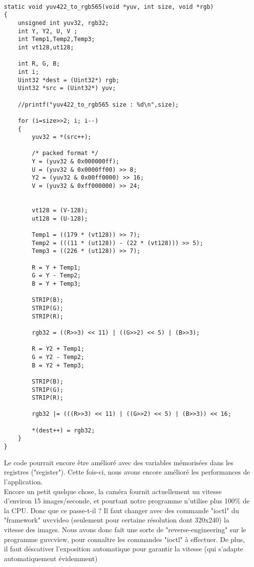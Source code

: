 \begin{lstlisting}[frame=single,style=C]  % Start your code-block

static void yuv422_to_rgb565(void *yuv, int size, void *rgb)
{
	unsigned int yuv32, rgb32;
	int Y, Y2, U, V ;
	int Temp1,Temp2,Temp3;
	int vt128,ut128;
	
	int R, G, B;
	int i;
	Uint32 *dest = (Uint32*) rgb;
	Uint32 *src = (Uint32*) yuv;

	//printf("yuv422_to_rgb565 size : %d\n",size);	

	for (i=size>>2; i; i--)
	{
		yuv32 = *(src++);

		/* packed format */
		Y = (yuv32 & 0x000000ff);
		U = (yuv32 & 0x0000ff00) >> 8;
		Y2 = (yuv32 & 0x00ff0000) >> 16;
		V = (yuv32 & 0xff000000) >> 24;


		vt128 = (V-128);
		ut128 = (U-128);	

		Temp1 = ((179 * (vt128)) >> 7);
		Temp2 = (((11 * (ut128)) - (22 * (vt128))) >> 5);
		Temp3 = ((226 * (ut128)) >> 7);

		R = Y + Temp1;
		G = Y - Temp2;
		B = Y + Temp3;

		STRIP(B);
		STRIP(G);
		STRIP(R);
	
		rgb32 = ((R>>3) << 11) | ((G>>2) << 5) | (B>>3);
		
		R = Y2 + Temp1;
		G = Y2 - Temp2;
		B = Y2 + Temp3;

		STRIP(B);
		STRIP(G);
		STRIP(R);

		rgb32 |= (((R>>3) << 11) | ((G>>2) << 5) | (B>>3)) << 16;

		*(dest++) = rgb32;
	}
}
\end{lstlisting}

Le code pourrait encore être amélioré avec des variables mémorisées dans les registres ("register"). Cette fois-ci, nous avons encore amélioré les performances de l'application.\\

Encore un petit quelque chose, la caméra fournit actuellement un vitesse d'environ 15 images/seconde, et pourtant notre programme n'utilise plus 100\% de la CPU. Donc que ce passe-t-il ? Il faut changer avec des commande "ioctl" du "framework" uvcvideo  (seulement pour certaine résolution dont 320x240)  la vitesse des images. Nous avons donc fait une sorte de "reverse-engineering" sur le programme guvcview, pour connaître les commandes "ioctl" à effectuer. De plus, il faut déscativer l'exposition automatique pour garantir la vitesse (qui s'adapte automatiquement évidemment)

